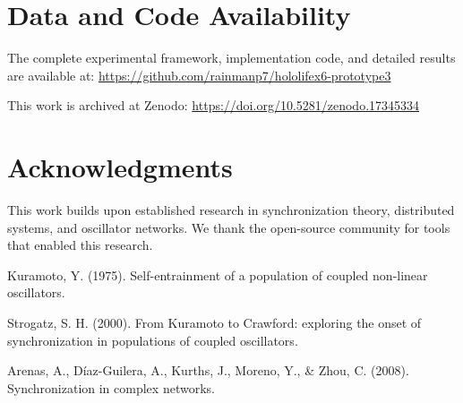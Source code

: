 \documentclass[12pt]{article}
\begin{document}
\section*{Data and Code Availability}
The complete experimental framework, implementation code, and detailed results are available at: \url{https://github.com/rainmanp7/hololifex6-prototype3}

This work is archived at Zenodo: \url{https://doi.org/10.5281/zenodo.17345334}

\section*{Acknowledgments}
This work builds upon established research in synchronization theory, distributed systems, and oscillator networks. We thank the open-source community for tools that enabled this research.

\begin{thebibliography}{9}
Kuramoto, Y. (1975). Self-entrainment of a population of coupled non-linear oscillators.

Strogatz, S. H. (2000). From Kuramoto to Crawford: exploring the onset of synchronization in populations of coupled oscillators.

Arenas, A., Díaz-Guilera, A., Kurths, J., Moreno, Y., \& Zhou, C. (2008). Synchronization in complex networks.
\end{thebibliography}
\end{document}
